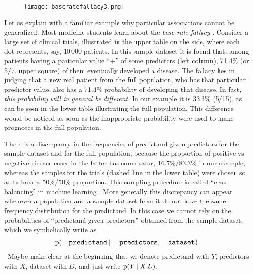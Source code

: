 \documentclass[utf8]{FrontiersinHarvard} %
\newcommand*{\wrench}{{\fontencoding{U}\fontfamily{fontawesomethree}\selectfont\symbol{114}}}
\newcommand{\mynotew}[1]{{\color{notecolour}\wrench\ #1}}
\newcommand*{\p}{\mathrm{p}}%
\renewcommand*{\|}[1][]{\nonscript\:#1\vert\nonscript\:\mathopen{}}
\begin{document}
\setlength{\intextsep}{0ex}%
\setlength{\columnsep}{1ex}%
\begin{figure}%
\texttt{[image: baseratefallacy3.png]}%
\end{figure}%
Let us explain with a familiar example why particular associations cannot be generalized. Most medicine students learn about the \emph{base-rate fallacy} \citep{barhillel1980,jennyetal2018,sprengeretal2021,matthews1996}. Consider a large set of clinical trials, illustrated in the upper table on the side, where each dot represents, say, 10\,000 patients. In this sample dataset it is found that, among patients having a particular value \enquote{+} of some predictors (left column), 71.4\% (or 5/7, upper square) of them eventually developed a disease. The fallacy lies in judging that a new real patient from the full population, who has that particular predictor value, also has a 71.4\% probability of developing that disease. In fact, \emph{this probability will in general be different}. In our example it is 33.3\% (5/15), as can be seen in the lower table illustrating the full population. This difference would be noticed as soon as the inappropriate probability were used to make prognoses in the full population.

There is a discrepancy in the frequencies of predictand given predictors for the sample dataset and for the full population, because the proportion of positive vs negative disease cases in the latter has some value, 16.7\%/83.3\% in our example, whereas the samples for the trials (dashed line in the lower table) were chosen so as to have a 50\%/50\% proportion. This sampling procedure is called \enquote{class balancing} in machine learning \citep{provost2000,drummondetal2005,weissetal2003}. More generally this discrepancy can appear whenever a population and a sample dataset from it do not have the same frequency distribution for the predictand. In this case we cannot rely on the probabilities of \enquote{predictand given predictors} obtained from the sample dataset, which we symbolically write as
\begin{equation}
  \p(\texttt{\small predictand} \| \texttt{\small predictors}, \texttt{\small dataset})
\end{equation}
\mynotew{Maybe make clear at the beginning that we denote predictand with $Y$, predictors with $X$, dataset with $D$, and just write $\p(Y\|X\,D)$.}
\end{document}

